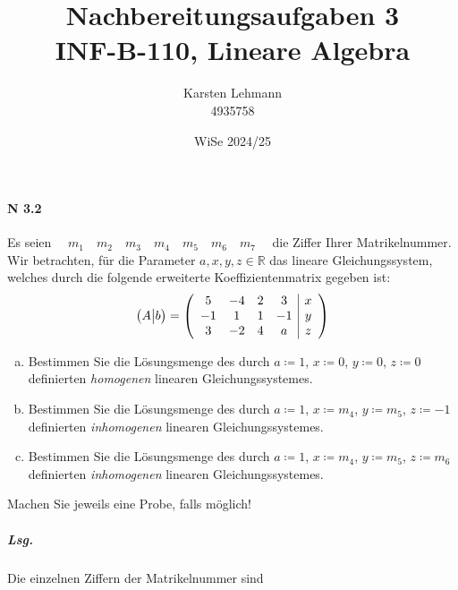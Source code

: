 \documentclass{scrreprt}
\author{Karsten Lehmann \\ 4935758}
\date{WiSe 2024/25}
\title{Nachbereitungsaufgaben 3\\INF-B-110, Lineare Algebra}
\begin{document}
\paragraph{N 3.2} Es seien
$\quad m_1 \quad m_2 \quad m_3 \quad m_4 \quad m_5 \quad m_6 \quad m_7 \quad$
die Ziffer Ihrer Matrikelnummer.
Wir betrachten, für die Parameter $a, x, y, z \in \mathbb{R}$ das lineare
Gleichungssystem, welches durch die folgende erweiterte Koeffizientenmatrix
gegeben ist:
\[
  \qty\big(A {\big|} b) =
  \qty(\begin{array}{cccc|c}
    5  & -4 & 2 & 3  & x \\
    -1 & 1  & 1 & -1 & y \\
    3  & -2 & 4 & a  & z \\
  \end{array})
\]

\begin{enumerate}[(a)]
\item Bestimmen Sie die Lösungsmenge des durch $a \coloneqq 1$, $x \coloneqq 0$,
  $y \coloneqq 0$, $z \coloneqq 0$ definierten \emph{homogenen} linearen
  Gleichungssystemes.

\item Bestimmen Sie die Lösungsmenge des durch $a \coloneqq 1$,
  $x \coloneqq m_4$, $y \coloneqq m_5$, $z \coloneqq -1$ definierten
  \emph{inhomogenen} linearen Gleichungssystemes.

\item Bestimmen Sie die Lösungsmenge des durch $a \coloneqq 1$,
  $x \coloneqq m_4$, $y \coloneqq m_5$, $z \coloneqq m_6$ definierten
  \emph{inhomogenen} linearen Gleichungssystemes.
\end{enumerate}
Machen Sie jeweils eine Probe, falls möglich!

\subparagraph{Lsg.} Die einzelnen Ziffern der Matrikelnummer sind
\end{document}

